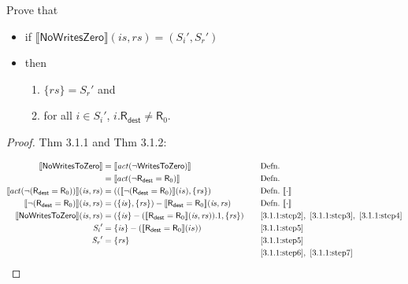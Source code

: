 \documentclass[12pt, letterpaper]{article}
\newcommand\interp[1]{\llbracket #1 \rrbracket}
\begin{document}
 Prove that
 \begin{itemize}
 \item  if
   $\interp{ \mathsf{NoWritesZero} } (\mathit{is}, \mathit{rs}) =
   (\mathit{S_i}',\mathit{S_r}')$
 \item then
   \begin{enumerate}
   \item $\mathit{\{rs\}} = \mathit{S_r'}$ and
   \item for all $i \in \mathit{S_i'}$, $i.\mathsf{R}_{\mathsf{dest}} \neq \mathsf{R}_0$.
   \end{enumerate}
 \end{itemize}
 \begin{proof}
 Thm 3.1.1 and Thm 3.1.2:
 \par\nobreak
 {\fontsize{10pt}{12pt}\selectfont
   \begin{alignat}{2}
     \setcounter{equation}{0}
     \label{3.1.1:step1}
     \interp{\mathsf{NoWritesToZero}}
     &= \interp{\mathit{act}(\neg \mathsf{WritesToZero})}
     &&\quad \text{Defn.}\\
     \label{3.1.1:step2}
     &= \interp{act(\neg \mathsf{R}_{\mathsf{dest}} = \mathsf{R}_0)}
     &&\quad \text{Defn.}\\
     \label{3.1.1:step3}
     \interp{act(\neg(\mathsf{R}_{\mathsf{dest}} = \mathsf{R}_0))}(\mathit{is}, \mathit{rs})
     &= ((\interp{\neg(\mathsf{R}_{\mathsf{dest}} = \mathsf{R}_0)}(is), \mathit{\{rs\}})
     &&\quad \text{Defn.}\ \interp{\cdot}\\    
     \label{3.1.1:step4}
     \interp{\neg(\mathsf{R}_{\mathsf{dest}} = \mathsf{R}_0)}(\mathit{is}, \mathit{rs})
     &= (\mathit{\{is\}}, \mathit{\{rs\}}) - \interp{\mathsf{R}_{\mathsf{dest}} = \mathsf{R}_0}(\mathit{is}, \mathit{rs})
     &&\quad \text{Defn.}\ \interp{\cdot}\\    
     \label{3.1.1:step5}
     \interp{\mathsf{NoWritesToZero}}(\mathit{is}, \mathit{rs})
     &= (\mathit{\{is\}} - (\interp{\mathsf{R}_{\mathsf{dest}} = \mathsf{R}_0}(\mathit{is}, \mathit{rs})).1, \mathit{\{rs\}})
     &&\quad \ref{3.1.1:step2},\ \ref{3.1.1:step3},\ \ref{3.1.1:step4}\\
     \label{3.1.1:step6}
     \mathit{S_i}' &= \mathit{\{is\}} - (\interp{\mathsf{R}_{\mathsf{dest}} = \mathsf{R}_0}(is))
     &&\quad \ref{3.1.1:step5} \\
     \label{3.1.1:step7}
     \mathit{S_r}' &= \mathit{\{rs\}}
     &&\quad \ref{3.1.1:step5} \\
     \label{3.1.1:qed}
     &\qedhere
    &&\quad \ref{3.1.1:step6},\ \ref{3.1.1:step7}
   \end{alignat}
 }%
 \end{proof}
 
\end{document}
